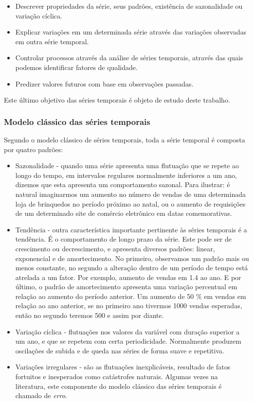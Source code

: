\documentclass[twoside,english,brazilian]{UNISINOSmonografia}
\begin{document}
\begin{itemize}
	\item Descrever propriedades da série, seus padrões, existência de sazonalidade ou variação cíclica.
	\item Explicar variações em um determinada série através das variações observadas em outra série temporal.
	\item Controlar processos através da análise de séries temporais, através das quais podemos identificar fatores de qualidade.
	\item Predizer valores futuros com base em observações passadas. 
\end{itemize}

Este último objetivo das séries temporais é objeto de estudo deste trabalho.

\subsubsection{Modelo clássico das séries temporais}

Segundo o modelo clássico de séries temporais, toda a série temporal é composta por quatro padrões:

\begin{itemize}
	\item Sazonalidade - quando uma série apresenta uma flutuação que se repete ao longo do tempo, em intervalos regulares normalmente inferiores a um ano, dizemos que esta apresenta um comportamento sazonal. Para ilustrar: é natural imaginarmos um aumento no número de vendas de uma determinada loja de brinquedos no período próximo ao natal, ou o aumento de requisições de um determinado site de comércio eletrônico em datas comemorativas. 
	\item Tendência - outra característica importante pertinente às séries temporais é a tendência. É o comportamento de longo prazo da série. Este pode ser de crescimento ou decrescimento, e apresenta diversos padrões: linear, exponencial e de amortecimento. No primeiro, observamos um padrão mais ou menos constante, no segundo a alteração dentro de um período de tempo está atrelada a um fator. Por exemplo, aumento de vendas em 1.4 ao ano. E por último, o padrão de amortecimento apresenta uma variação percentual em relação ao aumento do período anterior. Um aumento de 50 \% em vendas em relação ao ano anterior, se no primeiro ano tivermos 1000 vendas esperadas, então no segundo teremos 500 e assim por diante.
	\item Variação cíclica - flutuações nos valores da variável com duração superior a um ano, e que se repetem com certa periodicidade. Normalmente produzem oscilações de subida e de queda nas séries de forma suave e repetitiva.
	\item Variações irregulares - são as flutuações inexplicáveis, resultado de fatos fortuitos e inesperados como catástrofes naturais. Algumas vezes na literatura, este componente do modelo clássico das séries temporais é chamado de \textit{erro}.
\end{itemize}
\end{document}
